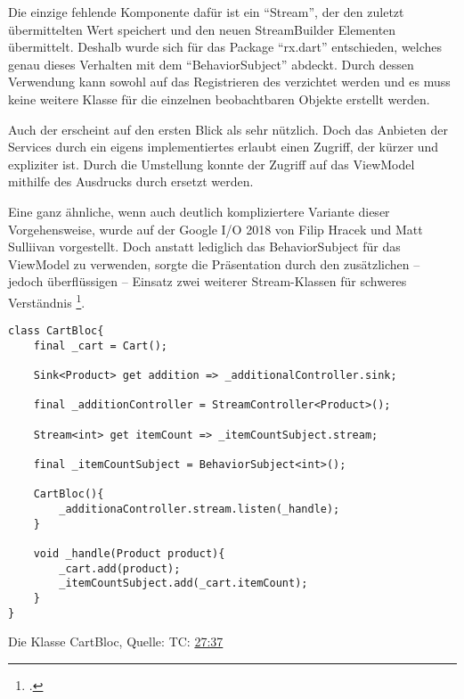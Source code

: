 Die einzige fehlende Komponente dafür ist ein \enquote{Stream},
der den zuletzt übermittelten Wert speichert und den neuen StreamBuilder Elementen übermittelt.
Deshalb wurde sich für das Package \enquote{rx.dart} entschieden,
welches genau dieses Verhalten mit dem \enquote{BehaviorSubject} abdeckt.
Durch dessen Verwendung kann sowohl auf das Registrieren des  verzichtet werden
und es muss keine weitere Klasse für die einzelnen beobachtbaren Objekte erstellt werden.

Auch der  erscheint auf den ersten Blick als sehr nützlich.
Doch das Anbieten der Services durch ein eigens implementiertes  erlaubt einen Zugriff,
der kürzer und expliziter ist.
Durch die Umstellung konnte der Zugriff auf das ViewModel mithilfe des Ausdrucks  durch  ersetzt werden.

Eine ganz ähnliche, wenn auch deutlich kompliziertere Variante dieser Vorgehensweise, wurde auf der Google I/O 2018 von Filip Hracek und Matt Sulliivan vorgestellt. Doch anstatt lediglich das BehaviorSubject für das ViewModel zu verwenden, sorgte die Präsentation durch den zusätzlichen -- jedoch überflüssigen -- Einsatz zwei weiterer Stream-Klassen für schweres Verständnis \Lst{\ref{lst:CartBloc}}\footcite[][TC: \href{https://youtu.be/RS36gBEp8OI?t=1657}{27:37}]{GoogleIO18}.

\ifIncludeFigures
  \begin{listing}[h]
    \begin{verbatim}
class CartBloc{
    final _cart = Cart();

    Sink<Product> get addition => _additionalController.sink;

    final _additionController = StreamController<Product>();

    Stream<int> get itemCount => _itemCountSubject.stream;

    final _itemCountSubject = BehaviorSubject<int>();

    CartBloc(){
        _additionaController.stream.listen(_handle);
    }

    void _handle(Product product){
        _cart.add(product);
        _itemCountSubject.add(_cart.itemCount);
    }
}
\end{verbatim}
    \caption[Die Klasse CartBloc]{Die Klasse CartBloc, Quelle: \cite{GoogleIO18} TC: \href{https://youtu.be/RS36gBEp8OI?t=1657}{27:37} \footnotemark}
    \label{lst:CartBloc}
  \end{listing}
\fi

